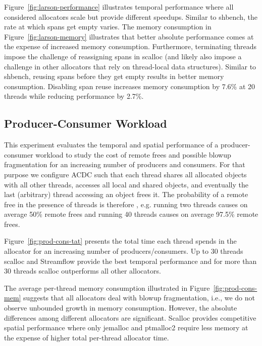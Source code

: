 \documentclass[10pt]{sigplanconf}
\begin{document}
Figure~\ref{fig:larson-performance} illustrates temporal performance where all
considered allocators scale but provide different speedups. Similar to shbench,
the rate at which spans get empty varies. The  memory consumption in
Figure~\ref{fig:larson-memory} illustrates that better absolute performance
comes at the expense of increased memory consumption. Furthermore, terminating
threads impose the challenge of reassigning spans in scalloc (and likely also
impose a challenge in other allocators that rely on thread-local data
structures). Similar to shbench, reusing spans before they get empty results in
better memory consumption. Disabling span reuse increases memory consumption by
7.6\% at 20 threads while reducing performance by 2.7\%.




\subsection{Producer-Consumer Workload}\label{sec:acdc-sharing}

This experiment evaluates the temporal and spatial performance of a
producer-consumer workload to study the cost of remote frees and possible blowup
fragmentation for an increasing number of producers and consumers. For that
purpose we configure ACDC such that each thread shares all allocated objects
with all other threads, accesses all local and shared objects, and eventually
the last (arbitrary) thread accessing an object frees it. The probability of a
remote free in the presence of  threads is therefore  , e.g. running
two threads causes on average 50\% remote frees and  running 40 threads causes
on average 97.5\% remote frees.

Figure~\ref{fig:prod-cons-tat} presents the total time each thread spends in the
allocator for an increasing number of producers/consumers. Up to 30 threads
scalloc and Streamflow provide the best temporal performance and for more than
30 threads scalloc outperforms all other allocators.

The average per-thread memory consumption illustrated in
Figure~\ref{fig:prod-cons-mem} suggests that all allocators deal with blowup
fragmentation, i.e., we do not observe unbounded growth in memory consumption.
However, the absolute differences among different allocators are significant.
Scalloc provides competitive spatial performance where only jemalloc and
ptmalloc2 require less memory at the expense of higher total per-thread
allocator time.
\end{document}
